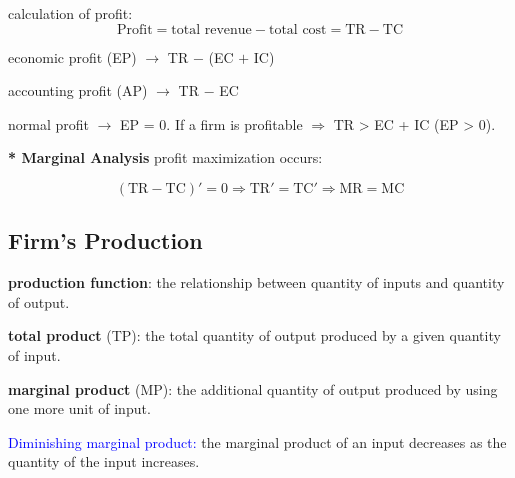 \documentclass[UTF8]{article}
\begin{document}
calculation of profit:
\begin{equation}
\text{Profit} = \text{total revenue} - \text{total cost} = \text{TR} - \text{TC}
\nonumber
\end{equation}

economic profit (EP) $\longrightarrow$ TR $-$ (EC $+$ IC)

accounting profit (AP) $\longrightarrow$ TR $-$ EC

normal profit $\longrightarrow$ EP = 0. If a firm is profitable $\Longrightarrow$ TR > EC + IC (EP > 0).

\textbf{* Marginal Analysis} profit maximization occurs:

\begin{equation}
    (\text{TR}-\text{TC})' = 0 \Longrightarrow \text{TR}' = \text{TC}' \Longrightarrow \text{MR} = \text{MC}
    \nonumber
\end{equation}

\subsection{Firm's Production}
\noindent

\textbf{production function}: the relationship between quantity of inputs and quantity of output.

\textbf{total product} (TP): the total quantity of output produced by a given quantity of input.

\textbf{marginal product} (MP): the additional quantity of output produced by using one more unit of input.

\textcolor{blue}{Diminishing marginal product:} the marginal product of an input decreases as the quantity of the input increases.
\end{document}

